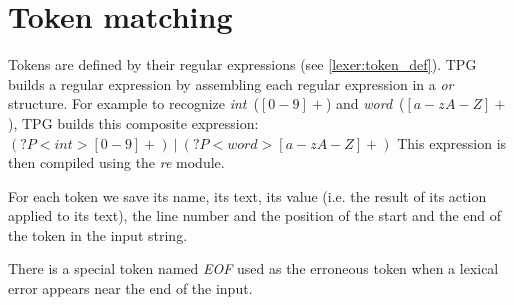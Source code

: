 \section{Token matching}

Tokens are defined by their regular expressions (see \ref{lexer:token_def}).
TPG builds a regular expression by assembling each regular expression in a \emph{or} structure.
For example to recognize \emph{int}~\mbox{($[0-9]+$)} and \emph{word}~\mbox{($[a-zA-Z]+$)}, TPG builds this composite expression:
$(?P<int>[0-9]+)~|~(?P<word>[a-zA-Z]+)$
This expression is then compiled using the \emph{re} module.

For each token we save its name, its text, its value (i.e. the result of its action applied to its text), the line number and the position of the start and the end of the token in the input string.

There is a special token named \emph{EOF} used as the erroneous token when a lexical error appears near the end of the input.
